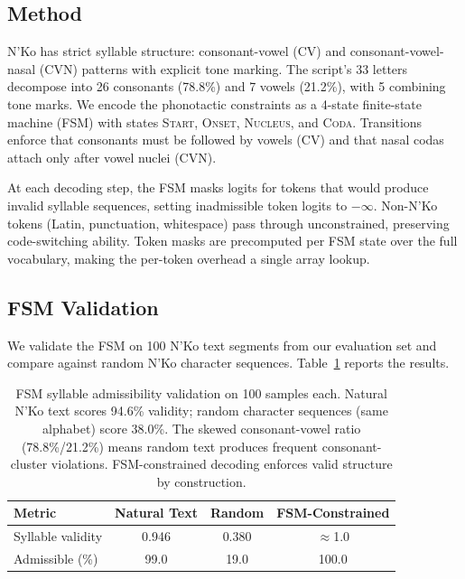 \documentclass[11pt]{article}
\begin{document}
\subsection{Method}

N'Ko has strict syllable structure: consonant-vowel (CV) and consonant-vowel-nasal (CVN) patterns with explicit tone marking.
The script's 33 letters decompose into 26 consonants (78.8\%) and 7 vowels (21.2\%), with 5 combining tone marks.
We encode the phonotactic constraints as a 4-state finite-state machine (FSM) with states \textsc{Start}, \textsc{Onset}, \textsc{Nucleus}, and \textsc{Coda}.
Transitions enforce that consonants must be followed by vowels (CV) and that nasal codas attach only after vowel nuclei (CVN).

At each decoding step, the FSM masks logits for tokens that would produce invalid syllable sequences, setting inadmissible token logits to $-\infty$.
Non-N'Ko tokens (Latin, punctuation, whitespace) pass through unconstrained, preserving code-switching ability.
Token masks are precomputed per FSM state over the full vocabulary, making the per-token overhead a single array lookup.

\subsection{FSM Validation}

We validate the FSM on 100 N'Ko text segments from our evaluation set and compare against random N'Ko character sequences.
Table~\ref{tab:admissibility} reports the results.

\begin{table}[t]
\centering
\small
\begin{tabular}{lccc}
\toprule
\textbf{Metric} & \textbf{Natural Text} & \textbf{Random} & \textbf{FSM-Constrained} \\
\midrule
Syllable validity & 0.946 & 0.380 & $\approx$1.0 \\
Admissible (\%) & 99.0 & 19.0 & 100.0 \\
\bottomrule
\end{tabular}
\caption{FSM syllable admissibility validation on 100 samples each. Natural N'Ko text scores 94.6\% validity; random character sequences (same alphabet) score 38.0\%. The skewed consonant-vowel ratio (78.8\%/21.2\%) means random text produces frequent consonant-cluster violations. FSM-constrained decoding enforces valid structure by construction.}
\label{tab:admissibility}
\end{table}
\end{document}

